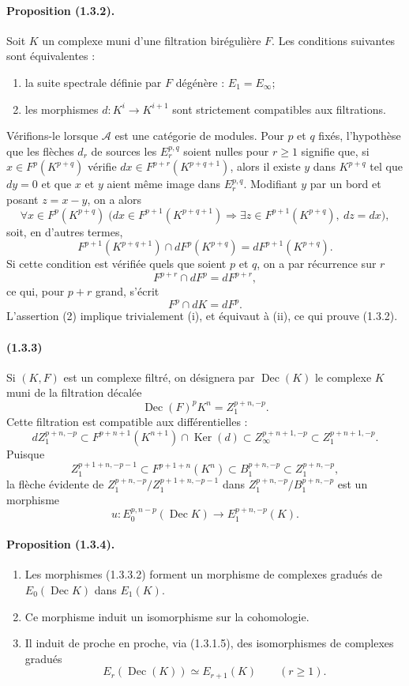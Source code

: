 \documentclass[10pt]{article}
\newcommand{\Ker}{\operatorname{Ker}}
\newcommand{\calA}{\mathcal A}
\newcommand{\Dec}{\operatorname{Dec}}
\begin{document}
\paragraph{Proposition (1.3.2).} Soit $K$ un complexe muni d'une filtration birégulière $F$. Les conditions suivantes sont équivalentes :
\begin{enumerate}[label=(\roman*)]
\item la suite spectrale définie par $F$ dégénère : $E_1=E_\infty$;
\item les morphismes $d:K^i\to K^{i+1}$ sont strictement compatibles aux filtrations.
\end{enumerate}
Vérifions-le lorsque $\calA$ est une catégorie de modules. Pour $p$ et $q$ fixés, l'hypothèse que les flèches $d_r$ de sources les $E_r^{p,q}$ soient nulles pour $r\geq 1$ signifie que, si $x\in F^p(K^{p+q})$ vérifie $dx\in F^{p+r}(K^{p+q+1})$, alors il existe $y$ dans $K^{p+q}$ tel que $dy=0$ et que $x$ et $y$ aient même image dans $E_r^{p,q}$. Modifiant $y$ par un bord et posant $z=x-y$, on a alors
\[
\forall x\in F^p(K^{p+q})\;\bigl(dx\in F^{p+1}(K^{p+q+1})\Rightarrow
\exists z\in F^{p+1}(K^{p+q}),\ dz=dx\bigr),
\]
soit, en d'autres termes,
\[
\tag{1}
F^{p+1}(K^{p+q+1})\cap dF^p(K^{p+q})=dF^{p+1}(K^{p+q}).
\]
Si cette condition est vérifiée quels que soient $p$ et $q$, on a par récurrence sur $r$
\[
F^{p+r}\cap dF^p=dF^{p+r},
\]
ce qui, pour $p+r$ grand, s'écrit
\[
\tag{2}
F^p\cap dK=dF^p.
\]
L'assertion (2) implique trivialement (i), et équivaut à (ii), ce qui prouve (1.3.2).

\paragraph{(1.3.3)} Si $(K,F)$ est un complexe filtré, on désignera par $\Dec(K)$ le complexe $K$ muni de la filtration décalée
\[
\Dec(F)^pK^n=Z_1^{p+n,-p}.
\]
Cette filtration est compatible aux différentielles :
\[
dZ_1^{p+n,-p}\subset F^{p+n+1}(K^{n+1})\cap\Ker(d)
       \subset Z_\infty^{p+n+1,-p}\subset Z_1^{p+n+1,-p}.
\]
Puisque
\[
\tag{1.3.3.1}
Z_1^{p+1+n,-p-1}\subset F^{p+1+n}(K^n)\subset B_1^{p+n,-p}\subset Z_1^{p+n,-p},
\]
la flèche évidente de $Z_1^{p+n,-p}/Z_1^{p+1+n,-p-1}$ dans $Z_1^{p+n,-p}/B_1^{p+n,-p}$ est un morphisme
\[
\tag{1.3.3.2}
u:E_0^{p,n-p}(\Dec K)\longrightarrow E_1^{p+n,-p}(K).
\]

\paragraph{Proposition (1.3.4).}
\begin{enumerate}[label=(\roman*)]
\item Les morphismes (1.3.3.2) forment un morphisme de complexes gradués de $E_0(\Dec K)$ dans $E_1(K)$.
\item Ce morphisme induit un isomorphisme sur la cohomologie.
\item Il induit de proche en proche, via (1.3.1.5), des isomorphismes de complexes gradués
\[
E_r(\Dec(K))\simeq E_{r+1}(K)\qquad(r\ge1).
\]
\end{enumerate}
\end{document}
